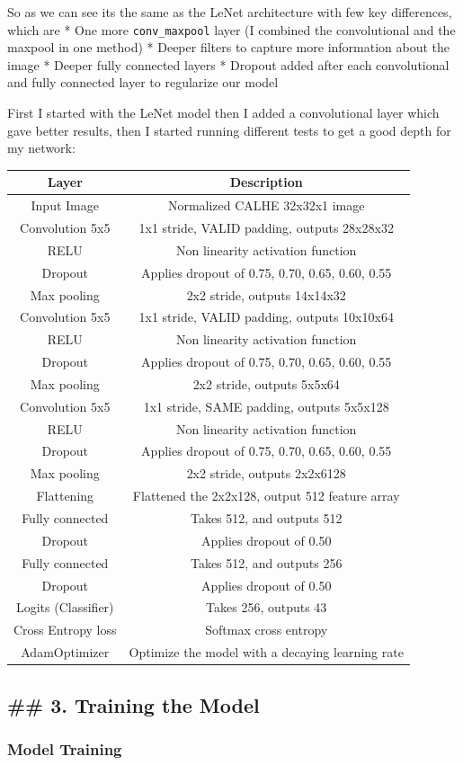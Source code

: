 \documentclass[11pt]{article}
\begin{document}
So as we can see its the same as the LeNet architecture with few key
differences, which are * One more \texttt{conv\_maxpool} layer (I
combined the convolutional and the maxpool in one method) * Deeper
filters to capture more information about the image * Deeper fully
connected layers * Dropout added after each convolutional and fully
connected layer to regularize our model

First I started with the LeNet model then I added a convolutional layer
which gave better results, then I started running different tests to get
a good depth for my network:

\begin{longtable}[]{@{}cc@{}}
\toprule
Layer & Description\tabularnewline
\midrule
\endhead
Input Image & Normalized CALHE 32x32x1 image\tabularnewline
Convolution 5x5 & 1x1 stride, VALID padding, outputs
28x28x32\tabularnewline
RELU & Non linearity activation function\tabularnewline
Dropout & Applies dropout of 0.75, 0.70, 0.65, 0.60, 0.55\tabularnewline
Max pooling & 2x2 stride, outputs 14x14x32\tabularnewline
Convolution 5x5 & 1x1 stride, VALID padding, outputs
10x10x64\tabularnewline
RELU & Non linearity activation function\tabularnewline
Dropout & Applies dropout of 0.75, 0.70, 0.65, 0.60, 0.55\tabularnewline
Max pooling & 2x2 stride, outputs 5x5x64\tabularnewline
Convolution 5x5 & 1x1 stride, SAME padding, outputs
5x5x128\tabularnewline
RELU & Non linearity activation function\tabularnewline
Dropout & Applies dropout of 0.75, 0.70, 0.65, 0.60, 0.55\tabularnewline
Max pooling & 2x2 stride, outputs 2x2x6128\tabularnewline
Flattening & Flattened the 2x2x128, output 512 feature
array\tabularnewline
Fully connected & Takes 512, and outputs 512\tabularnewline
Dropout & Applies dropout of 0.50\tabularnewline
Fully connected & Takes 512, and outputs 256\tabularnewline
Dropout & Applies dropout of 0.50\tabularnewline
Logits (Classifier) & Takes 256, outputs 43\tabularnewline
Cross Entropy loss & Softmax cross entropy\tabularnewline
AdamOptimizer & Optimize the model with a decaying learning
rate\tabularnewline
\bottomrule
\end{longtable}

    \hypertarget{training-the-model}{%
\subsection{\#\# 3. Training the Model}\label{training-the-model}}

\hypertarget{model-training}{%
\subsubsection{Model Training}\label{model-training}}
\end{document}
